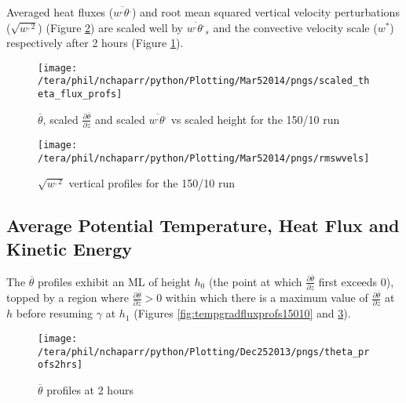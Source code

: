 Averaged heat fluxes ($\overline{w^{,}\theta^{,}}$) and root mean squared vertical velocity perturbations ($\sqrt{w^{,2}}$) (Figure \ref{fig:rmswvelprofs15010}) are scaled 
well by $\overline{w^{,}\theta^{,}}_{s}$ and the convective velocity scale ($w^{*}$) respectively after 2 hours 
(Figure \ref{fig:scaledtempgradfluxprofs15010}).\\


\begin{figure}[htbp]
    \centering
    \texttt{[image: /tera/phil/nchaparr/python/Plotting/Mar52014/pngs/scaled\_theta\_flux\_profs]}
    \caption{$\overline{\theta}$, scaled $\frac{\partial \overline{\theta}}{\partial z}$ and scaled $\overline{w^{,}\theta^{,}}$  vs scaled height for the 150/10 run}
    \label{fig:scaledtempgradfluxprofs15010}   %
\end{figure}

\begin{figure}[htbp]
    \centering
    \texttt{[image: /tera/phil/nchaparr/python/Plotting/Mar52014/pngs/rmswvels]}
    \caption{$\sqrt{w^{,2}}$ vertical profiles for the 150/10 run}
    \label{fig:rmswvelprofs15010}   %
\end{figure}

\clearpage

\subsection{Average Potential Temperature, Heat Flux and Kinetic Energy}
\FloatBarrier

The $\overline{\theta}$ profiles exhibit an \acs{ML} of height $h_{0}$ (the point at which $\frac{\partial \overline{\theta}}{\partial z}$ first exceeds 0), 
topped by a region where $\frac{\partial\overline{\theta}}{\partial z}>0$ within which there is a maximum value of $\frac{\partial \overline{\theta}}{\partial z}$ 
at $h$ before resuming $\gamma$  at $h_{1}$ (Figures \ref{fig:tempgradfluxprofs15010} and \ref{fig:pottempprofs2hrs}).\\

\begin{figure}[htbp]
    \centering
    \texttt{[image: /tera/phil/nchaparr/python/Plotting/Dec252013/pngs/theta\_profs2hrs]}
    \caption{$\overline{\theta}$ profiles at 2 hours}
    \label{fig:pottempprofs2hrs}   %
\end{figure}



